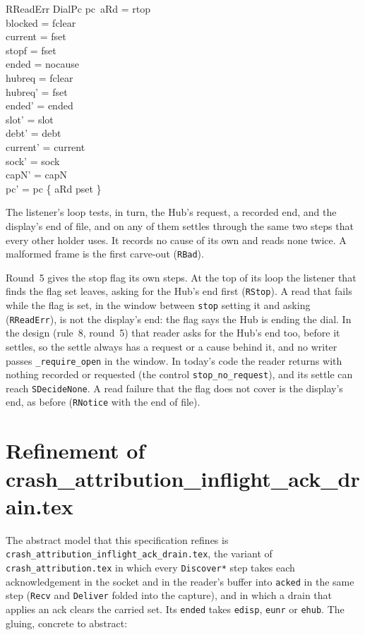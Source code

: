 \documentclass[a4paper,10pt,fleqn]{article}
\begin{document}
\begin{schema}{RReadErr}
  DialPc
\where
  pc~aRd = rtop \\
  blocked = fclear \\
  current = fset \\
  stopf = fset \\
  ended = nocause \\
  hubreq = fclear \\
  hubreq' = fset \\
  ended' = ended \\
  slot' = slot \\
  debt' = debt \\
  current' = current \\
  sock' = sock \\
  capN' = capN \\
  pc' = pc \oplus \{ aRd \mapsto pset \}
\end{schema}

The listener's loop tests, in turn, the Hub's request, a
recorded end, and the display's end of file, and on any of them settles through
the same two steps that every other holder uses.  It records no cause of its
own and reads none twice.  A malformed frame is the first carve-out
(\texttt{RBad}).

Round~5 gives the stop flag its own steps.  At the top of its loop the listener
that finds the flag set leaves, asking for the Hub's end first (\texttt{RStop}).
A read that fails while the flag is set, in the window between \texttt{stop}
setting it and asking (\texttt{RReadErr}), is not the display's end: the flag
says the Hub is ending the dial.  In the design (rule~8, round~5) that reader asks
for the Hub's end too, before it settles, so the settle always has a request or a
cause behind it, and no writer passes \texttt{\_require\_open} in the window.  In
today's code the reader returns with nothing recorded or requested (the control
\texttt{stop\_no\_request}), and its settle can reach \texttt{SDecideNone}.  A
read failure that the flag does not cover is the display's end, as before
(\texttt{RNotice} with the end of file).

\section{Refinement of crash\_attribution\_inflight\_ack\_drain.tex}

The abstract model that this specification refines is
\texttt{crash\_attribution\_inflight\_ack\_drain.tex}, the variant of
\texttt{crash\_attribution.tex} in which every \texttt{Discover*} step takes each
acknowledgement in the socket and in the reader's buffer into \texttt{acked} in
the same step (\texttt{Recv} and \texttt{Deliver} folded into the capture), and
in which a drain that applies an ack clears the carried set.  Its \texttt{ended}
takes \texttt{edisp}, \texttt{eunr} or \texttt{ehub}.  The gluing, concrete to
abstract:
\end{document}
